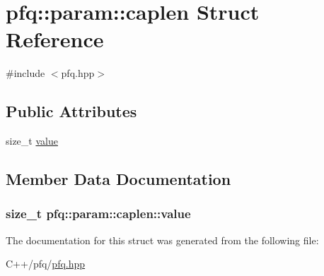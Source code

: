 \hypertarget{structpfq_1_1param_1_1caplen}{}\section{pfq\+:\+:param\+:\+:caplen Struct Reference}
\label{structpfq_1_1param_1_1caplen}


{\ttfamily \#include $<$pfq.\+hpp$>$}

\subsection*{Public Attributes}
\begin{DoxyCompactItemize}
\item 
size\+\_\+t \hyperlink{structpfq_1_1param_1_1caplen_ad706d73fbbd8342fea36e920253aaa02}{value}
\end{DoxyCompactItemize}


\subsection{Member Data Documentation}
\subsubsection[{\texorpdfstring{value}{value}}]{\setlength{\rightskip}{0pt plus 5cm}size\+\_\+t pfq\+::param\+::caplen\+::value}\hypertarget{structpfq_1_1param_1_1caplen_ad706d73fbbd8342fea36e920253aaa02}{}\label{structpfq_1_1param_1_1caplen_ad706d73fbbd8342fea36e920253aaa02}


The documentation for this struct was generated from the following file\+:\begin{DoxyCompactItemize}
\item 
C++/pfq/\hyperlink{pfq_8hpp}{pfq.\+hpp}\end{DoxyCompactItemize}

